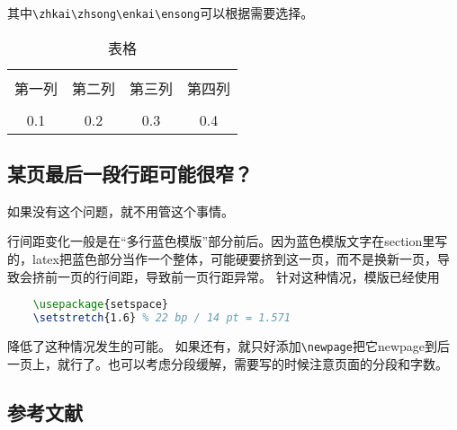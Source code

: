 其中\verb|\zhkai\zhsong\enkai\ensong|可以根据需要选择。
\begin{table}[htbp]
	\zhkai\ensong\selectfont%
	\centering  %
	\caption{表格}  %
	\label{table1}  %
	\begin{tabular}{|c|c|c|c|}  
		\hline  %
		& & & \\[-6pt]  %
		第一列&第二列&第三列&第四列 \\  %
		\hline
		& & & \\[-6pt]  %
		0.1&0.2&0.3&0.4 \\
		\hline
	\end{tabular}
\end{table}

\subsection{某页最后一段行距可能很窄？}
如果没有这个问题，就不用管这个事情。

行间距变化一般是在“多行蓝色模版”部分前后。因为蓝色模版文字在section里写的，latex把蓝色部分当作一个整体，可能硬要挤到这一页，而不是换新一页，导致会挤前一页的行间距，导致前一页行距异常。
针对这种情况，模版已经使用
\begin{lstlisting}[language=tex, basicstyle=\ttfamily\small, keywordstyle=\color{blue}, commentstyle=\color{gray}]
	%自动段落的行间距微调
	\usepackage{setspace}
	\setstretch{1.6} % 22 bp / 14 pt = 1.571
\end{lstlisting}
降低了这种情况发生的可能。
如果还有，就只好添加\verb|\newpage|把它newpage到后一页上，就行了。也可以考虑分段缓解，需要写的时候注意页面的分段和字数。

\begin{REF}
\subsection*{参考文献}
\vspace{-50pt}

\end{REF}

\newpage%
